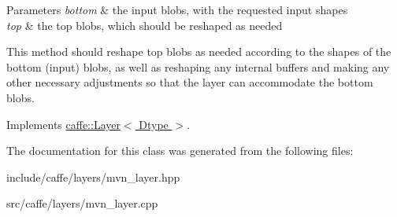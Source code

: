 \begin{DoxyParams}{Parameters}
{\em bottom} & the input blobs, with the requested input shapes \\
\hline
{\em top} & the top blobs, which should be reshaped as needed\\
\hline
\end{DoxyParams}
This method should reshape top blobs as needed according to the shapes of the bottom (input) blobs, as well as reshaping any internal buffers and making any other necessary adjustments so that the layer can accommodate the bottom blobs. 

Implements \hyperlink{classcaffe_1_1Layer_ad9d391b972c769c0ebee34ca6d1c973e}{caffe\+::\+Layer$<$ Dtype $>$}.



The documentation for this class was generated from the following files\+:\begin{DoxyCompactItemize}
\item 
include/caffe/layers/mvn\+\_\+layer.\+hpp\item 
src/caffe/layers/mvn\+\_\+layer.\+cpp\end{DoxyCompactItemize}
